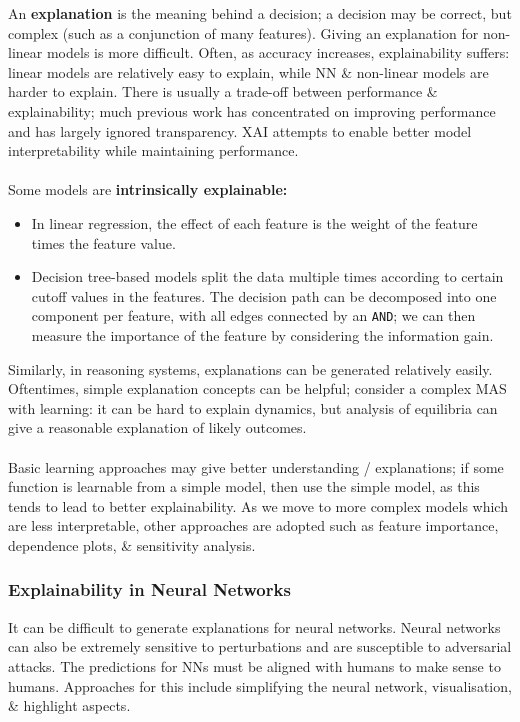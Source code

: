 \documentclass[a4paper,11pt]{article}
\begin{document}
An \textbf{explanation} is the meaning behind a decision;
a decision may be correct, but complex (such as a conjunction of many features).
Giving an explanation for non-linear models is more difficult.
Often, as accuracy increases, explainability suffers:
linear models are relatively easy to explain, while NN \& non-linear models are harder to explain. 
There is usually a trade-off between performance \& explainability;
much previous work has concentrated on improving performance and has largely ignored transparency.
XAI attempts to enable better model interpretability while maintaining performance.
\\\\
Some models are \textbf{intrinsically explainable:}
\begin{itemize}
    \item   In linear regression, the effect of each feature is the weight of the feature times the feature value.
    \item   Decision tree-based models split the data multiple times according to certain cutoff values in the features.
            The decision path can be decomposed into one component per feature, with all edges connected by an \verb|AND|;
            we can then measure the importance of the feature by considering the information gain.
\end{itemize}

Similarly, in reasoning systems, explanations can be generated relatively easily.
Oftentimes, simple explanation concepts can be helpful;
consider a complex MAS with learning: it can be hard to explain dynamics, but analysis of equilibria can give a reasonable explanation of likely outcomes.
\\\\
Basic learning approaches may give better understanding / explanations;
if some function is learnable from a simple model, then use the simple model, as this tends to lead to better explainability.
As we move to more complex models which are less interpretable, other approaches are adopted such as
feature importance, dependence plots, \& sensitivity analysis.

\subsubsection{Explainability in Neural Networks}
It can be difficult to generate explanations for neural networks.
Neural networks can also be extremely sensitive to perturbations and are susceptible to adversarial attacks.
The predictions for NNs must be aligned with humans to make sense to humans.
Approaches for this include simplifying the neural network, visualisation, \& highlight aspects.
\end{document}

